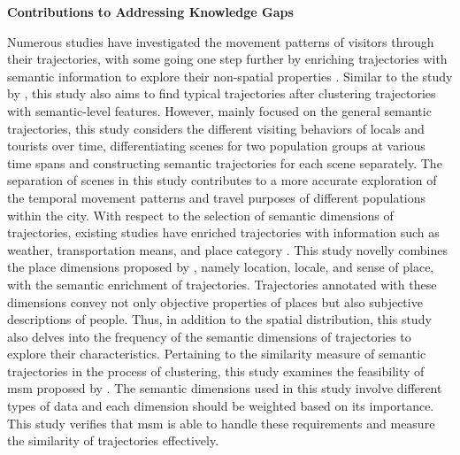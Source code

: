 \documentclass{article}
\theoremstyle{remark}
\begin{document}
\textbf{Contributions to Addressing Knowledge Gaps}

Numerous studies have investigated the movement patterns of visitors through their trajectories, with some going one step further by enriching trajectories with semantic information to explore their non-spatial properties \citep{parent_semantic_2013,yan_semantic_2013}. Similar to the study by \cite{cai_mining_2018}, this study also aims to find typical trajectories after clustering trajectories with semantic-level features. However, \cite{cai_mining_2018} mainly focused on the general semantic trajectories, this study considers the different visiting behaviors of locals and tourists over time, differentiating scenes for two population groups at various time spans and constructing semantic trajectories for each scene separately. The separation of scenes in this study contributes to a more accurate exploration of the temporal movement patterns and travel purposes of different populations within the city. With respect to the selection of semantic dimensions of trajectories, existing studies have enriched trajectories with information such as weather, transportation means, and place category \citep{ferrero_mastermovelets_2020}. This study novelly combines the place dimensions proposed by \citep{agnew_space_2011}, namely location, locale, and sense of place, with the semantic enrichment of trajectories. Trajectories annotated with these dimensions convey not only objective properties of places but also subjective descriptions of people. Thus, in addition to the spatial distribution, this study also delves into the frequency of the semantic dimensions of trajectories to explore their characteristics. Pertaining to the similarity measure of semantic trajectories in the process of clustering, this study examines the feasibility of \acrfull{msm} proposed by \cite{furtado_multidimensional_2016}. The semantic dimensions used in this study involve different types of data and each dimension should be weighted based on its importance. This study verifies that \acrshort{msm} is able to handle these requirements and measure the similarity of trajectories effectively.



\end{document}
